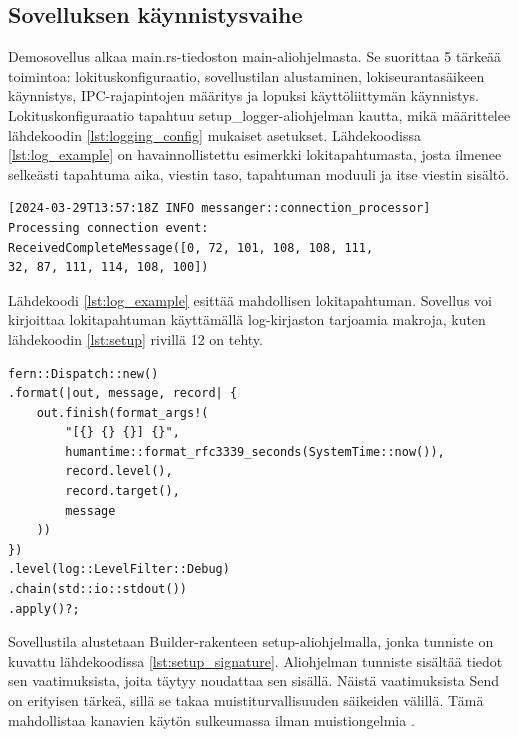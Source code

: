 \documentclass[a4paper,12pt]{article}
\begin{document}
    \subsection{Sovelluksen käynnistysvaihe}

    Demosovellus alkaa main.rs-tiedoston main-aliohjelmasta.
    Se suorittaa 5 tärkeää toimintoa: lokituskonfiguraatio, sovellustilan alustaminen, lokiseurantasäikeen käynnistys, IPC-rajapintojen määritys ja lopuksi käyttöliittymän käynnistys. \\
    
    Lokituskonfiguraatio tapahtuu setup\_logger-aliohjelman kautta, mikä määrittelee lähdekoodin \ref{lst:logging_config} mukaiset asetukset.
    Lähdekoodissa \ref{lst:log_example} on havainnollistettu esimerkki lokitapahtumasta, josta ilmenee selkeästi tapahtuma aika,
    viestin taso, tapahtuman moduuli ja itse viestin sisältö.

    \begin{lstlisting}[caption={Esimerkki lokitapahtumasta.}, label={lst:log_example}]
[2024-03-29T13:57:18Z INFO messanger::connection_processor]
Processing connection event:
ReceivedCompleteMessage([0, 72, 101, 108, 108, 111,
32, 87, 111, 114, 108, 100])
    \end{lstlisting}
    
    Lähdekoodi \ref{lst:log_example} esittää mahdollisen lokitapahtuman. Sovellus voi kirjoittaa lokitapahtuman käyttämällä log-kirjaston tarjoamia makroja, kuten lähdekoodin \ref{lst:setup} rivillä 12 on tehty.\par

    \begin{lstlisting}[caption={Lokituskonfiguraatio}, label={lst:logging_config}]
fern::Dispatch::new()
.format(|out, message, record| {
    out.finish(format_args!(
        "[{} {} {}] {}",
        humantime::format_rfc3339_seconds(SystemTime::now()),
        record.level(),
        record.target(),
        message
    ))
})
.level(log::LevelFilter::Debug)
.chain(std::io::stdout())
.apply()?;
    \end{lstlisting}


    Sovellustila alustetaan Builder-rakenteen setup-aliohjelmalla, jonka tunniste on kuvattu lähdekoodissa \ref{lst:setup_signature}. Aliohjelman tunniste sisältää tiedot sen vaatimuksista, joita täytyy noudattaa sen sisällä. Näistä vaatimuksista Send on erityisen tärkeä, sillä se takaa muistiturvallisuuden säikeiden välillä. Tämä mahdollistaa kanavien käytön sulkeumassa ilman muistiongelmia \cite[luku 8.2]{rust-book}. \par
\end{document}
